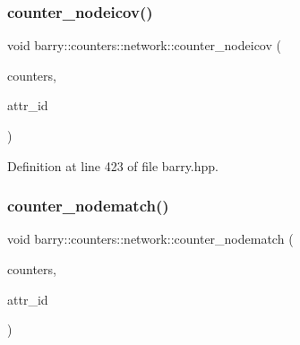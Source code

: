 \mbox{\label{namespacebarry_1_1counters_1_1network_aef48e4ae85d30c2a949006faee2b5bae}} 
\subsubsection{\texorpdfstring{counter\+\_\+nodeicov()}{counter\_nodeicov()}}
{\footnotesize\ttfamily void barry\+::counters\+::network\+::counter\+\_\+nodeicov (\begin{DoxyParamCaption}\item[{\hyperlink{namespacebarry_1_1counters_1_1network_a3b3c590303d47840d1967372ae495d95}{Net\+Counter\+Vector} $\ast$}]{counters,  }\item[{\hyperlink{namespacebarry_a11dfc53ddb4672278319aa04f1e09a6c}{uint}}]{attr\+\_\+id }\end{DoxyParamCaption})\hspace{0.3cm}{\ttfamily [inline]}}



Definition at line 423 of file barry.\+hpp.

\mbox{\label{namespacebarry_1_1counters_1_1network_ab0a33b2990950574552ab909e6847f96}} 
\subsubsection{\texorpdfstring{counter\+\_\+nodematch()}{counter\_nodematch()}}
{\footnotesize\ttfamily void barry\+::counters\+::network\+::counter\+\_\+nodematch (\begin{DoxyParamCaption}\item[{\hyperlink{namespacebarry_1_1counters_1_1network_a3b3c590303d47840d1967372ae495d95}{Net\+Counter\+Vector} $\ast$}]{counters,  }\item[{\hyperlink{namespacebarry_a11dfc53ddb4672278319aa04f1e09a6c}{uint}}]{attr\+\_\+id }\end{DoxyParamCaption})\hspace{0.3cm}{\ttfamily [inline]}}



